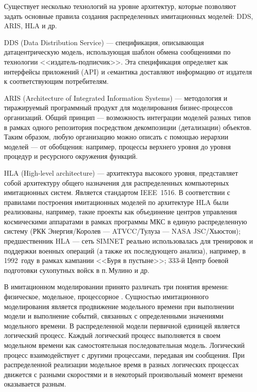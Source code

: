 Существует несколько технологий на уровне архитектур, которые позволяют задать основные правила создания распределенных имитационных моделей: DDS, ARIS, HLA и др.


DDS (Data Distribution Service)  --- спецификация, описывающая датацентрическую модель, использующая шаблон обмена сообщениями по технологии <<издатель-подписчик>>. Эта спецификация определяет как интерфейсы приложений (API) и cемантика доставляют информацию от издателя к соответствующим потребителям.

ARIS (Architecture of Integrated Information Systems)  ---  методология и тиражируемый программный продукт для моделирования бизнес-процессов организаций. Общий принцип --- возможность интеграции моделей разных типов в рамках одного репозитория посредством декомпозиции (детализации) объектов. Таким образом, любую организацию можно описать с помощью иерархии моделей --- от обобщения: например, процессы верхнего уровня до уровня процедур и ресурсного окружения функций.

HLA (High-level architecture) --- архитектура высокого уровня, представляет собой архитектуру общего назначения для распределенных компьютерных имитационных систем. Является стандартом IEEE~1516.
В соответствии с правилами построения имитационных моделей по архитектуре HLA были реализованы, например, такие проекты как объединение центров управления космическими аппаратами в рамках программы МКС в единую распределенную систему (РКК Энергия/Королев --- ATVCC/Тулуза --- NASA JSC/Хьюстон); предшественник HLA --- сеть SIMNET реально использовалась для тренировок и поддержки военных операций (а также их последующего анализа), например, в 1992~году в рамках кампании <<Буря в пустыне>>; 333-й Центр боевой подготовки сухопутных войск в п.\,Мулино и др.

В имитационном моделировании принято различать три понятия времени: физическое, модельное, процессорное \cite{okol}. Сущностью имитационного моделирования является продвижение модельного времени при выполнении модели и выполнение событий, связанных с определенными значениями модельного времени. В распределенной модели первичной единицей является логический процесс. Каждый логический процесс выполняется в своем модельном времени как самостоятельная последовательная модель. Логический процесс взаимодействует с другими процессами, передавая им сообщения. При распределенной реализации модельное время в разных логических процессах движется с разными скоростями и в некоторый произвольный момент времени оказывается разным.

